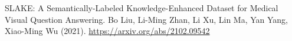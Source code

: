 \documentclass{adonis}
\begin{document}

		
		
			
			
			
			
			
	
	

	
	
	\begin{thebibliography}{5}
		SLAKE: A Semantically-Labeled Knowledge-Enhanced Dataset for Medical Visual Question Answering. Bo Liu, Li-Ming Zhan, Li Xu, Lin Ma, Yan Yang, Xiao-Ming Wu (2021). \url{https://arxiv.org/abs/2102.09542}
	\end{thebibliography}
	
\end{document}
